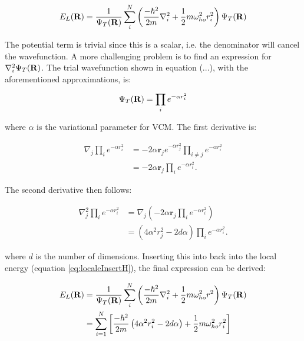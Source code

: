 \documentclass[english, a4paper]{article}
\newcommand\lr[1]{\left(#1\right)}
\newcommand{\bm}[1]{\mathbf{#1}}
\begin{document}
\begin{equation}
  E_L({\bf R})=\frac{1}{\Psi_T({\bf R})}\sum_i^N \left(
  \frac{-\hbar^2}{2m}
  \nabla_{i}^2 +
  \frac{1}{2}m\omega_{ho}^2r_i^2\right)\Psi_T({\bf R})
  \label{eq:localeInsertH}
\end{equation}

The potential term is trivial since this is a scalar, i.e. the denominator will cancel the wavefunction. A more challenging problem is to find an expression for $\nabla^2_i\Psi_T({\bf R})$. The trial wavefunction shown in equation (...), with the aforementioned approximations, is:

\begin{equation}
 \Psi_T({\bf R}) = \prod_i e^{-\alpha r_i^2}	\label{wavefunction_a}
\end{equation}

where $\alpha$ is the variational parameter for VCM. The first derivative is:

\begin{align}
 \nabla_j\prod_i e^{-\alpha r_i^2} 
 &= -2\alpha \bm{r}_j e^{-\alpha r_j^2} \prod_{i \neq j} e^{-\alpha r_i^2}\\
 &= -2\alpha \bm{r}_j  \prod_i e^{-\alpha r_i^2}.
 \label{E_L_first_derivative}
\end{align}

The second derivative then follows:

\begin{align}
 \nabla_j^2 \prod_i e^{-\alpha r_i^2} 
 &= \nabla_j \lr{-2\alpha \bm{r}_j  \prod_i e^{-\alpha r_i^2}}\\
 &= \lr{4\alpha^2 r_j^2 - 2d\alpha}  \prod_i e^{-\alpha r_i^2}.	\label{simpleLaplacian}
\end{align}

where $d$ is the number of dimensions. Inserting this into back into the local energy (equation \eqref{eq:localeInsertH}), the final expression can be derived:

\begin{align}
\begin{split}
 E_L({\bf R}) &= \frac{1}{\Psi_T({\bf R})}\sum_i^N \lr{
	 \frac{-\hbar^2}{2m}
	 \nabla_{i}^2 +
	\frac{1}{2}m\omega_{ho}^2r^2}\Psi_T({\bf R})\\
    &= \sum_{i=1}^N\left[\frac{-\hbar^2}{2m}\lr{4\alpha^2 r_i^2 - 2d\alpha} + \frac{1}{2}m\omega_{ho}^2r_i^2\right] \label{SimpleLocalEnergies}
\end{split}
\end{align}
\end{document}
